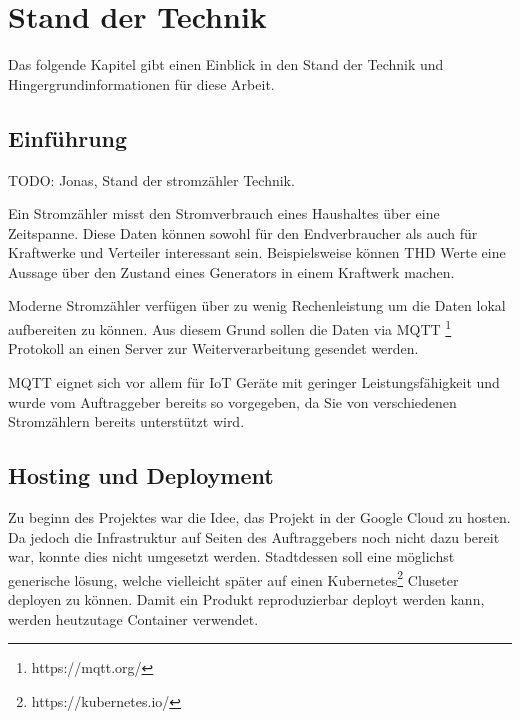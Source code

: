 \chapter{Stand der Technik}

Das folgende Kapitel gibt einen Einblick in den Stand der Technik und Hingergrundinformationen
für diese Arbeit.

\section{Einführung}

TODO: Jonas, Stand der stromzähler Technik.

Ein Stromzähler \cite{wikipedia:meter} misst den Stromverbrauch eines Haushaltes über eine
Zeitspanne. Diese Daten können sowohl für den Endverbraucher als auch für Kraftwerke
und Verteiler interessant sein. Beispielsweise können \ac{THD} \cite{siemens:disw_2021}
Werte eine Aussage über den Zustand eines Generators in einem Kraftwerk machen. \cite{thd-generators}

Moderne Stromzähler verfügen über zu wenig Rechenleistung um die Daten lokal
aufbereiten zu können. \cite{dc450-technical-data}
Aus diesem Grund sollen die Daten via \ac{MQTT} \footnote{https://mqtt.org/} Protokoll
an einen Server zur Weiterverarbeitung gesendet werden.

\ac{MQTT} eignet sich vor allem für \ac{IoT} Geräte mit geringer Leistungsfähigkeit
und wurde vom Auftraggeber bereits so vorgegeben, da Sie von verschiedenen
Stromzählern bereits unterstützt wird.

\section{Hosting und Deployment}

Zu beginn des Projektes war die Idee, das Projekt in der Google Cloud zu hosten.
Da jedoch die Infrastruktur auf Seiten des Auftraggebers noch nicht dazu bereit
war, konnte dies nicht umgesetzt werden. Stadtdessen soll eine möglichst
generische lösung, welche vielleicht später auf einen Kubernetes\footnote{https://kubernetes.io/}
Cluseter deployen zu können. Damit ein Produkt reproduzierbar
deployt werden kann, werden heutzutage Container verwendet. \cite{what-is-a-container}


